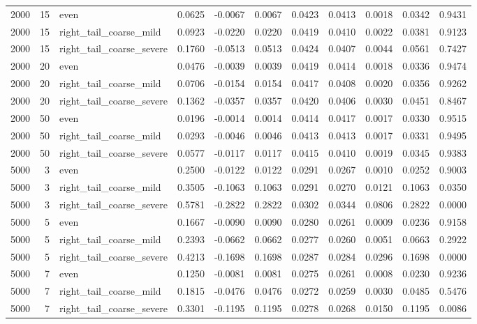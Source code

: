 \begin{table}[!h]
{\begin{tabular}[t]{rrlrrrrrrrr}
2000 & 15 & even & 0.0625 & -0.0067 & 0.0067 & 0.0423 & 0.0413 & 0.0018 & 0.0342 & 0.9431\\
2000 & 15 & right\_tail\_coarse\_mild & 0.0923 & -0.0220 & 0.0220 & 0.0419 & 0.0410 & 0.0022 & 0.0381 & 0.9123\\
2000 & 15 & right\_tail\_coarse\_severe & 0.1760 & -0.0513 & 0.0513 & 0.0424 & 0.0407 & 0.0044 & 0.0561 & 0.7427\\
2000 & 20 & even & 0.0476 & -0.0039 & 0.0039 & 0.0419 & 0.0414 & 0.0018 & 0.0336 & 0.9474\\
2000 & 20 & right\_tail\_coarse\_mild & 0.0706 & -0.0154 & 0.0154 & 0.0417 & 0.0408 & 0.0020 & 0.0356 & 0.9262\\
2000 & 20 & right\_tail\_coarse\_severe & 0.1362 & -0.0357 & 0.0357 & 0.0420 & 0.0406 & 0.0030 & 0.0451 & 0.8467\\
2000 & 50 & even & 0.0196 & -0.0014 & 0.0014 & 0.0414 & 0.0417 & 0.0017 & 0.0330 & 0.9515\\
2000 & 50 & right\_tail\_coarse\_mild & 0.0293 & -0.0046 & 0.0046 & 0.0413 & 0.0413 & 0.0017 & 0.0331 & 0.9495\\
2000 & 50 & right\_tail\_coarse\_severe & 0.0577 & -0.0117 & 0.0117 & 0.0415 & 0.0410 & 0.0019 & 0.0345 & 0.9383\\
5000 & 3 & even & 0.2500 & -0.0122 & 0.0122 & 0.0291 & 0.0267 & 0.0010 & 0.0252 & 0.9003\\
5000 & 3 & right\_tail\_coarse\_mild & 0.3505 & -0.1063 & 0.1063 & 0.0291 & 0.0270 & 0.0121 & 0.1063 & 0.0350\\
5000 & 3 & right\_tail\_coarse\_severe & 0.5781 & -0.2822 & 0.2822 & 0.0302 & 0.0344 & 0.0806 & 0.2822 & 0.0000\\
5000 & 5 & even & 0.1667 & -0.0090 & 0.0090 & 0.0280 & 0.0261 & 0.0009 & 0.0236 & 0.9158\\
5000 & 5 & right\_tail\_coarse\_mild & 0.2393 & -0.0662 & 0.0662 & 0.0277 & 0.0260 & 0.0051 & 0.0663 & 0.2922\\
5000 & 5 & right\_tail\_coarse\_severe & 0.4213 & -0.1698 & 0.1698 & 0.0287 & 0.0284 & 0.0296 & 0.1698 & 0.0000\\
5000 & 7 & even & 0.1250 & -0.0081 & 0.0081 & 0.0275 & 0.0261 & 0.0008 & 0.0230 & 0.9236\\
5000 & 7 & right\_tail\_coarse\_mild & 0.1815 & -0.0476 & 0.0476 & 0.0272 & 0.0259 & 0.0030 & 0.0485 & 0.5476\\
5000 & 7 & right\_tail\_coarse\_severe & 0.3301 & -0.1195 & 0.1195 & 0.0278 & 0.0268 & 0.0150 & 0.1195 & 0.0086\\

\end{tabular}}
\end{table}
